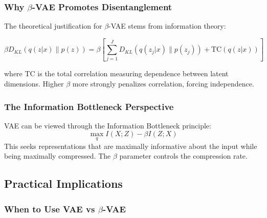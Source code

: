 \documentclass[conference]{IEEEtran}
\begin{document}
\subsubsection{Why $\beta$-VAE Promotes Disentanglement}

The theoretical justification for $\beta$-VAE stems from information theory:

\begin{equation}
\beta D_{KL}(q(z|x) \| p(z)) = \beta \left[ \sum_{j=1}^{J} D_{KL}(q(z_j|x) \| p(z_j)) + \text{TC}(q(z|x)) \right]
\end{equation}

where TC is the total correlation measuring dependence between latent dimensions. Higher $\beta$ more strongly penalizes correlation, forcing independence.

\subsubsection{The Information Bottleneck Perspective}

VAE can be viewed through the Information Bottleneck principle:
\begin{equation}
\max_{q} I(X; Z) - \beta I(Z; X)
\end{equation}
This seeks representations that are maximally informative about the input while being maximally compressed. The $\beta$ parameter controls the compression rate.

\subsection{Practical Implications}

\subsubsection{When to Use VAE vs $\beta$-VAE}

\begin{table}[!t]
\centering
\small
{}
\caption{Recommended VAE configurations for different applications}
\label{tab:applications}
\end{table}
\end{document}
